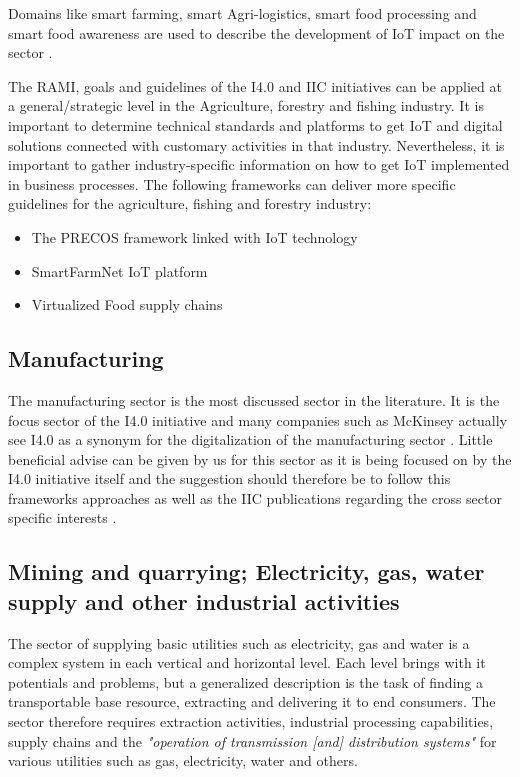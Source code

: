 Domains like smart farming, smart Agri-logistics, smart food processing and smart food awareness are used to describe the development of \ac{IoT} impact on the sector \cite[p.133]{FoodAndFarm2020}.

The \ac{RAMI}, goals and guidelines of the \ac{I4.0} and \ac{IIC} initiatives can be applied at a general/strategic level in the Agriculture, forestry and fishing industry. It is important to determine technical standards and platforms to get \ac{IoT} and digital solutions connected with customary activities in that industry. Nevertheless, it is important to gather industry-specific information on how to get \ac{IoT} implemented in business processes.
The following frameworks can deliver more specific guidelines for the agriculture, fishing and forestry industry:

\begin{itemize}
\item The PRECOS framework linked with \ac{IoT} technology \cite{Trolard2016590}
\item SmartFarmNet \ac{IoT} platform \cite{InternetOfThingsAgricultureSmartFarming}
\item Virtualized Food supply chains \cite{Verdouw2016128}
\end{itemize}


\subsection{Manufacturing}
The manufacturing sector is the most discussed sector in the literature. It is the focus sector of the \ac{I4.0} initiative and many companies such as McKinsey actually see \ac{I4.0} as a synonym for the digitalization of the manufacturing sector \cite[]{McKinseydigitizationIndustrialSector:2015}. Little beneficial advise can be given by us for this sector as it is being focused on by the \ac{I4.0} initiative itself and the suggestion should therefore be to follow this frameworks approaches as well as the \ac{IIC} publications regarding the cross sector specific interests \cite[]{iicarchitecture:2016}.

\subsection{Mining and quarrying; Electricity, gas, water supply and other industrial activities }

The sector of supplying basic utilities such as electricity, gas and water is a complex system in each vertical and horizontal level. Each level brings with it potentials and problems, but a generalized description is the task of finding a transportable base resource, extracting and delivering it to end consumers. The sector therefore requires extraction activities, industrial processing capabilities, supply chains and the \emph{"operation of transmission [and] distribution systems"}\cite[p. 166ff]{ISIC:2008} for various utilities such as gas, electricity, water and others.

